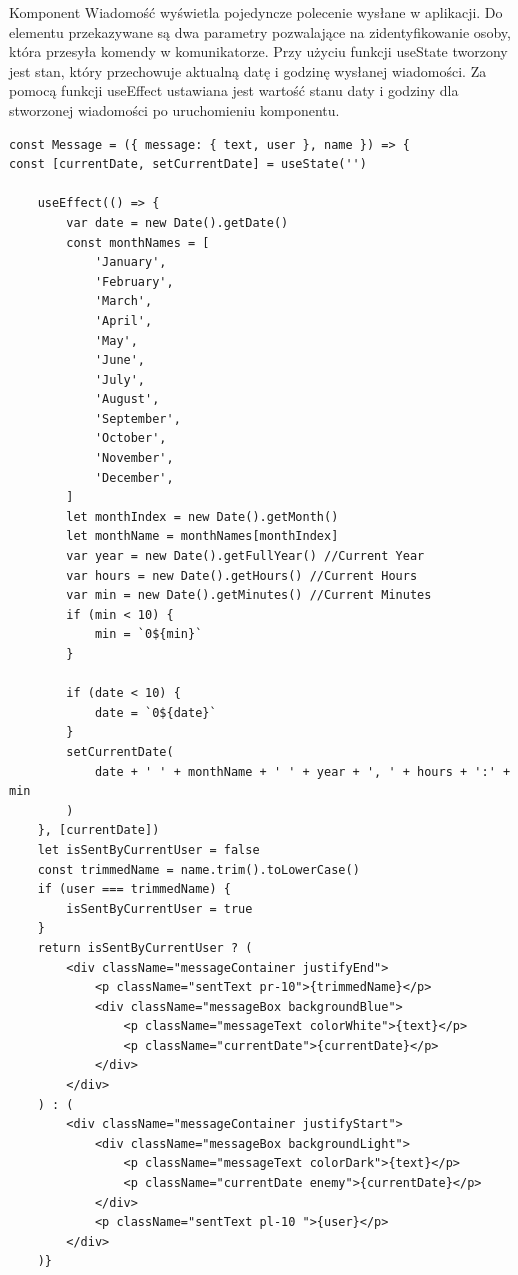 Komponent Wiadomość wyświetla pojedyncze polecenie wysłane w aplikacji. Do elementu przekazywane są dwa parametry pozwalające na zidentyfikowanie osoby, która przesyła komendy w komunikatorze. Przy użyciu funkcji useState tworzony jest stan, który przechowuje aktualną datę i godzinę wysłanej wiadomości. Za pomocą funkcji useEffect ustawiana jest wartość stanu daty i godziny dla stworzonej wiadomości po uruchomieniu komponentu.  
\begin{lstlisting}[caption=Implementacja komponentu z pojedyncza wiadomoscia ]
const Message = ({ message: { text, user }, name }) => {
const [currentDate, setCurrentDate] = useState('')

    useEffect(() => {
        var date = new Date().getDate() 
        const monthNames = [
            'January',
            'February',
            'March',
            'April',
            'May',
            'June',
            'July',
            'August',
            'September',
            'October',
            'November',
            'December',
        ]
        let monthIndex = new Date().getMonth()
        let monthName = monthNames[monthIndex]
        var year = new Date().getFullYear() //Current Year
        var hours = new Date().getHours() //Current Hours
        var min = new Date().getMinutes() //Current Minutes
        if (min < 10) {
            min = `0${min}`
        }

        if (date < 10) {
            date = `0${date}`
        }
        setCurrentDate(
            date + ' ' + monthName + ' ' + year + ', ' + hours + ':' + min
        )
    }, [currentDate])
    let isSentByCurrentUser = false
    const trimmedName = name.trim().toLowerCase()
    if (user === trimmedName) {
        isSentByCurrentUser = true
    }
    return isSentByCurrentUser ? (
        <div className="messageContainer justifyEnd">
            <p className="sentText pr-10">{trimmedName}</p>
            <div className="messageBox backgroundBlue">
                <p className="messageText colorWhite">{text}</p>
                <p className="currentDate">{currentDate}</p>
            </div>
        </div>
    ) : (
        <div className="messageContainer justifyStart">
            <div className="messageBox backgroundLight">
                <p className="messageText colorDark">{text}</p>
                <p className="currentDate enemy">{currentDate}</p>
            </div>
            <p className="sentText pl-10 ">{user}</p>
        </div>
    )}
\end{lstlisting}

